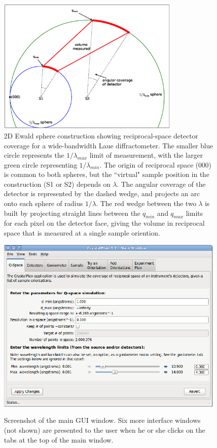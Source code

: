 \documentclass[draft]{iucr}              %
\begin{document}
\begin{figure}
\caption{2D Ewald sphere construction showing reciprocal-space detector coverage
for a wide-bandwidth Laue diffractometer. The smaller blue circle represents the
$1/\lambda_{max}$ limit of measurement, with the larger green circle
representing $1/\lambda_{min}$. The origin of reciprocal space (000) is common to both
spheres, but the ``virtual" sample position in the construction (S1 or S2)
depends on $\lambda$. The angular coverage of the detector is represented by the dashed
wedge, and projects an arc onto each sphere of radius $1/\lambda$. The
red wedge between the two $\lambda$ is built by projecting straight lines between the
$q_{min}$ and $q_{max}$ limits for each pixel on the detector face, giving the
volume in reciprocal space that is measured at a single sample oriention. }

\includegraphics[width=3.5in]{ewald_fig.ps}
     
\label{fig:ewald_fig} 
\end{figure} 
 
  
\begin{figure}
\caption{Screenshot of the main GUI window. Six more interface windows (not
shown) are presented to the user when he or she clicks on the tabs at the
top of the main window.}
\includegraphics{main_gui.eps}
\label{fig:screenshots}
\end{figure}
 
\end{document}
